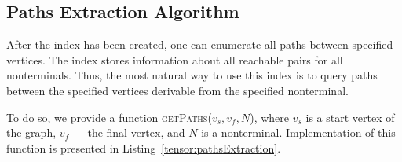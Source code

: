 \subsection{Paths Extraction Algorithm}

After the index has been created, one can enumerate all paths between specified vertices.
The index stores information about all reachable pairs for all nonterminals.
Thus, the most natural way to use this index is to query paths between the specified vertices derivable from the specified nonterminal.

To do so, we provide a function \textsc{getPaths}($v_s, v_f, N$), where $v_s$ is a start vertex of the graph, $v_f$ --- the final vertex, and $N$ is a nonterminal.
Implementation of this function is presented in Listing~\ref{tensor:pathsExtraction}.

